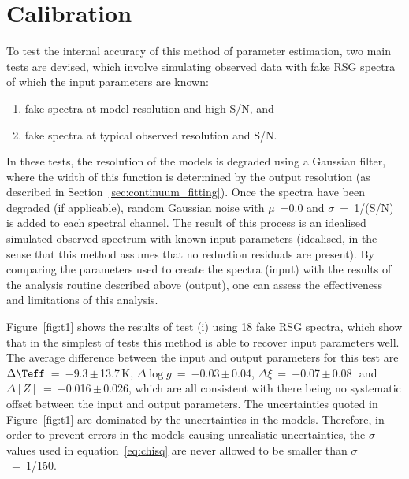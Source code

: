 \section{Calibration} %
\label{sec:calibration}

To test the internal accuracy of this method of parameter estimation, two main tests are devised, which involve simulating observed data with fake RSG spectra of which the input parameters are known:

\begin{enumerate}
    \item fake spectra at model resolution and high S/N, and
    \item fake spectra at typical observed resolution and S/N.
\end{enumerate}

In these tests, the resolution of the models is degraded using a Gaussian filter, where the width of this function is determined by the output resolution (as described in Section~\ref{sec:continuum_fitting}).
Once the spectra have been degraded (if applicable), random Gaussian noise with $\mu$~=0.0 and $\sigma$~=~1/(S/N) is added to each spectral channel.
The result of this process is an idealised simulated observed spectrum with known input parameters
(idealised, in the sense that this method assumes that no reduction residuals are present).
By comparing the parameters used to create the spectra (input) with the results of the analysis routine described above (output), one can assess the effectiveness and limitations of this analysis.

Figure~\ref{fig:t1} shows the results of test (i) using 18 fake RSG spectra, which show that in the simplest of tests this method is able to recover input parameters well.
The average difference between the input and output parameters for this test are
$\Delta\Teff$~=~$-$9.3\,$\pm$\,13.7\,K,
$\Delta\log g$~=~$-$0.03\,$\pm$\,0.04,
$\Delta\xi$~=~$-$0.07\,$\pm$\,0.08\,\kms~and
$\Delta[Z]$~=~$-$0.016\,$\pm$\,0.026,
which are all consistent with there being no systematic offset between the input and output parameters.
The uncertainties quoted in Figure~\ref{fig:t1} are dominated by the uncertainties in the models.
Therefore, in order to prevent errors in the models causing unrealistic uncertainties,
the $\sigma$-values used in equation~\ref{eq:chisq} are never allowed to be smaller than $\sigma$~=~1/150.

